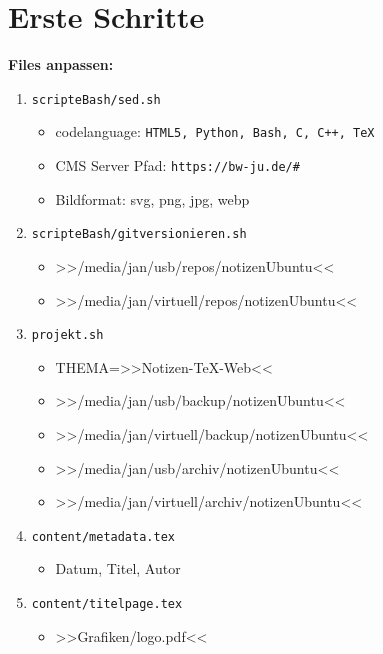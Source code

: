 \section{Erste Schritte}\label{erste-schritte}

\textbf{Files anpassen:}

\begin{enumerate}
\item
  \verb|scripteBash/sed.sh|

  \begin{itemize}
  \item
    codelanguage:
    \verb|HTML5, Python, Bash, C, C++, TeX|
  \item
    CMS Server Pfad: \verb|https://bw-ju.de/#|
  \item
    Bildformat: svg, png, jpg, webp
  \end{itemize}
\item
  \verb|scripteBash/gitversionieren.sh|

  \begin{itemize}
  \item
    >>/media/jan/usb/repos/notizenUbuntu<<
  \item
    >>/media/jan/virtuell/repos/notizenUbuntu<<
  \end{itemize}
\item
  \verb|projekt.sh|

  \begin{itemize}
  \item
    THEMA=>>Notizen-TeX-Web<<
  \item
    >>/media/jan/usb/backup/notizenUbuntu<<
  \item
    >>/media/jan/virtuell/backup/notizenUbuntu<<
  \item
    >>/media/jan/usb/archiv/notizenUbuntu<<
  \item
    >>/media/jan/virtuell/archiv/notizenUbuntu<<
  \end{itemize}
\item
  \verb|content/metadata.tex|

  \begin{itemize}
  \item
    Datum, Titel, Autor
  \end{itemize}
\item
  \verb|content/titelpage.tex|

  \begin{itemize}
  \item
    >>Grafiken/logo.pdf<<
  \end{itemize}
\end{enumerate}

